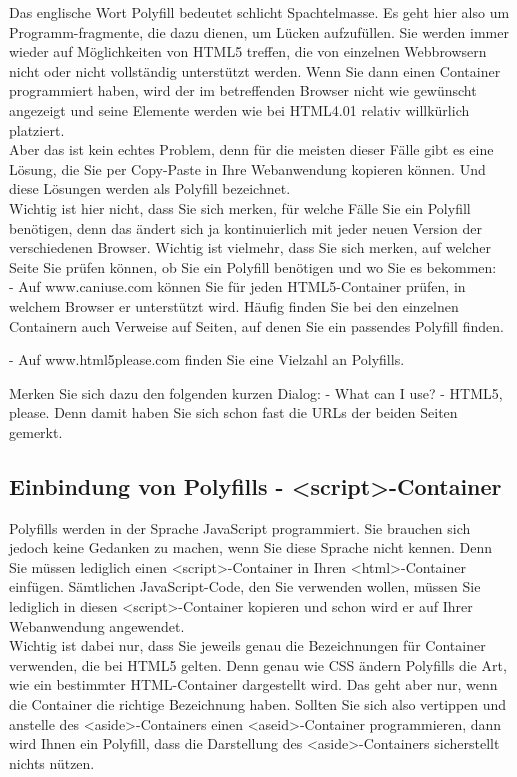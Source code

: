 Das englische Wort Polyfill bedeutet schlicht Spachtelmasse. Es geht hier also um Programm-fragmente, die dazu dienen, um Lücken aufzufüllen. Sie werden immer wieder auf Möglichkeiten von HTML5 treffen, die von einzelnen Webbrowsern nicht oder nicht vollständig unterstützt werden. Wenn Sie dann einen Container programmiert haben, wird der im betreffenden Browser nicht wie gewünscht angezeigt und seine Elemente werden wie bei HTML4.01 relativ willkürlich platziert.\\

Aber das ist kein echtes Problem, denn für die meisten dieser Fälle gibt es eine Lösung, die Sie per Copy-Paste in Ihre Webanwendung kopieren können. Und diese Lösungen werden als Polyfill bezeichnet.\\

Wichtig ist hier nicht, dass Sie sich merken, für welche Fälle Sie ein Polyfill benötigen, denn das ändert sich ja kontinuierlich mit jeder neuen Version der verschiedenen Browser. Wichtig ist vielmehr, dass Sie sich merken, auf welcher Seite Sie prüfen können, ob Sie ein Polyfill benötigen und wo Sie es bekommen:\\

-	Auf www.caniuse.com können Sie für jeden HTML5-Container prüfen, in welchem Browser er unterstützt wird. Häufig finden Sie bei den einzelnen Containern auch Verweise auf Seiten, auf denen Sie ein passendes Polyfill finden.

-	Auf www.html5please.com finden Sie eine Vielzahl an Polyfills.

Merken Sie sich dazu den folgenden kurzen Dialog: 
-	What can I use?
-	HTML5, please. 
Denn damit haben Sie sich schon fast die URLs der beiden Seiten gemerkt.

\subsection{Einbindung von Polyfills - <script>-Container}

Polyfills werden in der Sprache JavaScript programmiert. Sie brauchen sich jedoch keine Gedanken zu machen, wenn Sie diese Sprache nicht kennen. Denn Sie müssen lediglich einen <script>-Container in Ihren <html>-Container einfügen. Sämtlichen JavaScript-Code, den Sie verwenden wollen, müssen Sie lediglich in diesen <script>-Container kopieren und schon wird er auf Ihrer Webanwendung angewendet.\\

Wichtig ist dabei nur, dass Sie jeweils genau die Bezeichnungen für Container verwenden, die bei HTML5 gelten. Denn genau wie CSS ändern Polyfills die Art, wie ein bestimmter HTML-Container dargestellt wird. Das geht aber nur, wenn die Container die richtige Bezeichnung haben. Sollten Sie sich also vertippen und anstelle des <aside>-Containers einen <aseid>-Container programmieren, dann wird Ihnen ein Polyfill, dass die Darstellung des <aside>-Containers sicherstellt nichts nützen.\\

